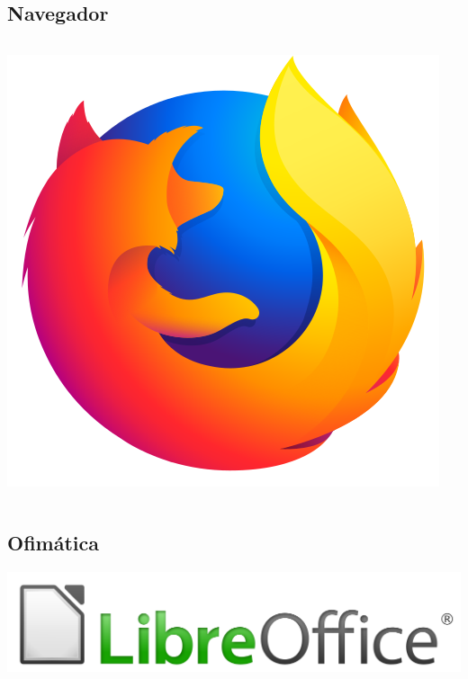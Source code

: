 \subsection{Navegador}
\begin{frame}
    \begin{columns}
            \includegraphics[width=\textwidth]{Firefox_Logo_2017.png}
    \end{columns}
\end{frame}

\subsection{Ofimática}
\begin{frame}
        \includegraphics[width=\textwidth]{LibreOffice_logo.png}
\end{frame}


